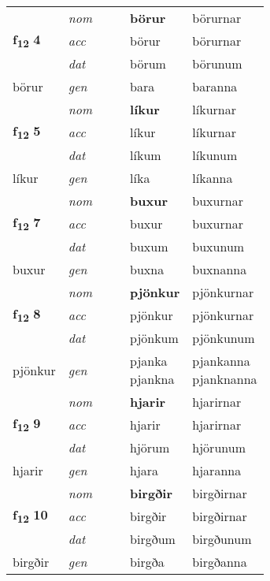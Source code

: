 \begin{longtable}[l]{X>{\footnotesize\itshape}XXXXX}
\multirow{3}{*}{{{\textbf{f{\textsubscript{12}}} \Large{\textbf{4}}}}} & nom &  &  & \textbf{börur} & börurnar \\*
 & acc &  &  & börur & börurnar \\*
 & dat &  &  & börum & börunum \\*
 {\footnotesize{börur}} & gen & \textbf{} &  & bara & baranna \\
\cmidrule{1-6}

\multirow{3}{*}{{{\textbf{f{\textsubscript{12}}} \Large{\textbf{5}}}}} & nom &  &  & \textbf{líkur} & líkurnar \\*
 & acc &  &  & líkur & líkurnar \\*
 & dat &  &  & líkum & líkunum \\*
 {\footnotesize{líkur}} & gen & \textbf{} &  & líka & líkanna \\
\cmidrule{1-6}

\multirow{3}{*}{{{\textbf{f{\textsubscript{12}}} \Large{\textbf{7}}}}} & nom &  &  & \textbf{buxur} & buxurnar \\*
 & acc &  &  & buxur & buxurnar \\*
 & dat &  &  & buxum & buxunum \\*
 {\footnotesize{buxur}} & gen & \textbf{} &  & buxna & buxnanna \\
\cmidrule{1-6}

\multirow{3}{*}{{{\textbf{f{\textsubscript{12}}} \Large{\textbf{8}}}}} & nom &  &  & \textbf{pjönkur} & pjönkurnar \\*
 & acc &  &  & pjönkur & pjönkurnar \\*
 & dat &  &  & pjönkum & pjönkunum \\*
 {\footnotesize{pjönkur}} & gen & \textbf{} &  & \specialcell{pjanka\\ pjankna} & \specialcell{pjankanna\\ pjanknanna} \\
\cmidrule{1-6}

\multirow{3}{*}{{{\textbf{f{\textsubscript{12}}} \Large{\textbf{9}}}}} & nom &  &  & \textbf{hjarir} & hjarirnar \\*
 & acc &  &  & hjarir & hjarirnar \\*
 & dat &  &  & hjörum & hjörunum \\*
 {\footnotesize{hjarir}} & gen & \textbf{} &  & hjara & hjaranna \\
\cmidrule{1-6}

\multirow{3}{*}{{{\textbf{f{\textsubscript{12}}} \Large{\textbf{10}}}}} & nom &  &  & \textbf{birgðir} & birgðirnar \\*
 & acc &  &  & birgðir & birgðirnar \\*
 & dat &  &  & birgðum & birgðunum \\*
 {\footnotesize{birgðir}} & gen & \textbf{} &  & birgða & birgðanna \\
\cmidrule{1-6}


\end{longtable}
